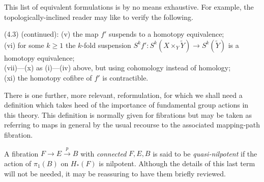 \documentclass[openany,leqno]{book}  %
\begin{document}
This list of equivalent formulations is by no means exhaustive. For example, the topologically-inclined reader may like to verify the following.

(4.3) (continued): (v) the map $f'$ suspends to a homotopy equivalence;\\
(vi) for some $k \geqslant 1 $ the $k$-fold suspension $S^kf' \colon   S^k(X\times_Y\widetilde{Y}) \longrightarrow S^k(\widetilde{Y})$ is a homotopy equivalence;\\
(vii)---(x) as (i)---(iv) above, but using cohomology instead of homology;\\
(xi) the homotopy cofibre of $f'$ is contractible.

There is one further, more relevant, reformulation, for which we shall need a definition which takes heed of the importance of fundamental group actions in this theory. This definition is normally given for fibrations but may be taken as referring to maps in general by the usual recourse to the associated mapping-path fibration.

A fibration $F\longrightarrow E\overset{p}\longrightarrow B$ with {\em connected} $F, E, B$ is said to be {\em quasi-nilpotent} if the action of $\pi_1(B)$ on $H_*(F)$ is nilpotent. Although the details of this last term will not be needed, it may be reassuring to have them briefly reviewed.
\end{document}
